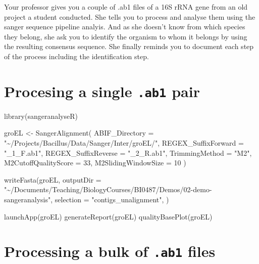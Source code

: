 \documentclass[
  letterpaper,
]{scrbook}
\newenvironment{Shaded}{\begin{snugshade}}{\end{snugshade}}
\newcommand{\AttributeTok}[1]{\textcolor[rgb]{0.40,0.46,0.14}{#1}}
\newcommand{\DecValTok}[1]{\textcolor[rgb]{0.68,0.00,0.00}{#1}}
\newcommand{\FunctionTok}[1]{\textcolor[rgb]{0.28,0.35,0.67}{#1}}
\newcommand{\NormalTok}[1]{\textcolor[rgb]{0.00,0.46,0.62}{#1}}
\newcommand{\OtherTok}[1]{\textcolor[rgb]{0.00,0.46,0.62}{#1}}
\newcommand{\StringTok}[1]{\textcolor[rgb]{0.13,0.47,0.30}{#1}}
\begin{document}
Your professor gives you a couple of .ab1 files of a 16S rRNA gene from
an old project a student conducted. She tells you to process and analyse
them using the sanger sequence pipeline analyis. And as she doesn't know
from which species they belong, she ask you to identify the organism to
whom it belongs by using the resulting consensus sequence. She finally
reminds you to document each step of the process including the
identification step.

\hypertarget{procesing-a-single-.ab1-pair}{%
\section*{\texorpdfstring{Procesing a single \texttt{.ab1}
pair}{Procesing a single .ab1 pair}}\label{procesing-a-single-.ab1-pair}}

\begin{Shaded}
\begin{Highlighting}[]
\FunctionTok{library}\NormalTok{(sangeranalyseR)}

\NormalTok{groEL }\OtherTok{\textless{}{-}} \FunctionTok{SangerAlignment}\NormalTok{(}
  \AttributeTok{ABIF\_Directory =} \StringTok{"\textasciitilde{}/Projects/Bacillus/Data/Sanger/Inter/groEL/"}\NormalTok{,}
  \AttributeTok{REGEX\_SuffixForward =} \StringTok{"\_1\_F.ab1"}\NormalTok{,}
  \AttributeTok{REGEX\_SuffixReverse =} \StringTok{"\_2\_R.ab1"}\NormalTok{,}
  \AttributeTok{TrimmingMethod =} \StringTok{"M2"}\NormalTok{,}
  \AttributeTok{M2CutoffQualityScore =} \DecValTok{33}\NormalTok{,}
  \AttributeTok{M2SlidingWindowSize =} \DecValTok{10}
\NormalTok{)}

\FunctionTok{writeFasta}\NormalTok{(groEL, }
           \AttributeTok{outputDir =} \StringTok{"\textasciitilde{}/Documents/Teaching/BiologyCourses/BI0487/Demos/02{-}demo{-}sangeranalysis"}\NormalTok{,}
           \AttributeTok{selection =} \StringTok{"contigs\_unalignment"}\NormalTok{,}
\NormalTok{           )}

\FunctionTok{launchApp}\NormalTok{(groEL)}
\FunctionTok{generateReport}\NormalTok{(groEL)}
\FunctionTok{qualityBasePlot}\NormalTok{(groEL)}
\end{Highlighting}
\end{Shaded}

\hypertarget{processing-a-bulk-of-.ab1-files}{%
\section*{\texorpdfstring{Processing a bulk of \texttt{.ab1}
files}{Processing a bulk of .ab1 files}}\label{processing-a-bulk-of-.ab1-files}}
\end{document}
